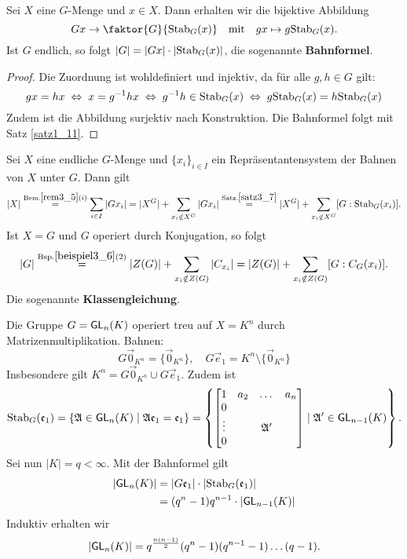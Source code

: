 \begin{satz}[Bahnensatz]\label{satz3_7}
	Sei $X$ eine $G$-Menge und $x \in X$. Dann erhalten wir die bijektive Abbildung 
	\[Gx \to \faktor{G}{\stab_G(x)}\quad\text{mit}\quad gx \mapsto g \stab_G(x).\]
	Ist $G$ endlich, so folgt $|G| = |Gx| \cdot |\mathrm{Stab}_G(x)|$, die sogenannte \textbf{Bahnformel}.
\end{satz}
\begin{proof}
	Die Zuordnung ist wohldefiniert und injektiv, da für alle $g, h \in G$ gilt: 
	\[gx = hx \;\Leftrightarrow\; x=g^{-1}hx \;\Leftrightarrow\; g^{-1}h \in \mathrm{Stab}_G(x) \;\Leftrightarrow\; g \mathrm{Stab}_G(x) = h \mathrm{Stab}_G(x)\]
	Zudem ist die Abbildung surjektiv nach Konstruktion. Die Bahnformel folgt mit Satz \ref{satz1_11}.
\end{proof}
\begin{kor}\label{kor3_8}
	Sei $X$ eine endliche $G$-Menge und $\{x_i\}_{i \in I}$ ein Repräsentantensystem der Bahnen von $X$ unter $G$. Dann gilt
	\[|X| \overset{\text{Bem.} \ref{rem3_5} (i)}{=}  \sum_{i \in I} |G{x_i}| = |X^G| + \sum_{x_i \notin X^G} |G{x_i}| \overset{\text{Satz.} \ref{satz3_7}}{=} |X^G| + \sum_{x_i \notin X^G} [G: \mathrm{Stab}_G(x_i)].\]
	Ist $X =G$ und $G$ operiert durch Konjugation, so folgt
	\[|G| \overset{\text{Bsp.} \ref{beispiel3_6} (2)}{=} |Z(G)| + \sum_{x_i \notin Z(G)} |C_{x_i}| = |Z(G)| + \sum_{x_i \notin Z(G)} [G : C_G(x_i)].\]
	Die sogenannte \textbf{Klassengleichung}.
\end{kor}
\begin{beispiel}\label{beispiel3_9}
	Die Gruppe $G = \mathsf{GL}_n(K)$ operiert treu auf $X = K^n$ durch Matrizenmultiplikation. Bahnen:
	\[G\vec{0}_{K^n} = \{\vec{0}_{K^n}\}, \quad G\vec{e}_1 = K^n \setminus \{\vec{0}_{K^n}\}\]
	Insbesondere gilt $K^n = G\vec{0}_{K^n} \cup G\vec{e}_1$. Zudem ist
	\[\mathrm{Stab}_G(\mathfrak{e}_1) = \{\mathfrak{A} \in \mathsf{GL}_n(K) \mid \mathfrak{A}\mathfrak{e}_1 = \mathfrak{e}_1\} = \left\{\begin{bmatrix}
		1 & a_2 & \dots & a_n\\
		0 & & & \\
		\vdots & & \mathfrak{A}' &\\
		0 & & &
	\end{bmatrix} \mid \mathfrak{A}' \in \mathsf{GL}_{n-1}(K)\right\}.\]
	Sei nun $|K| = q < \infty$. Mit der Bahnformel gilt
	\begin{align*}
		|\mathsf{GL}_n(K)| &= |G\mathfrak{e}_1| \cdot |\mathrm{Stab}_G(\mathfrak{e}_1)|\\
		&= (q^n - 1) q^{n-1} \cdot |\mathsf{GL}_{n-1}(K)|
	\end{align*}
	Induktiv erhalten wir
	\[|\mathsf{GL}_n(K)| = q^{\frac{n(n-1)}{2}} (q^n - 1)(q^{n-1} -1)\dots(q-1).\]
\end{beispiel}
